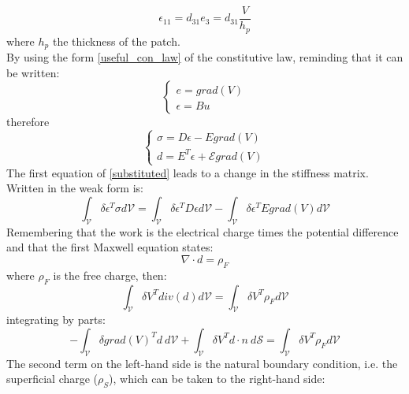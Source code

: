 \documentclass[twocolumn,a4paper,10pt,english]{article}
\begin{document}
            \begin{equation*}
            \epsilon_{11}=d_{31}e_3=d_{31}\dfrac{V}{h_p}
            \end{equation*}
            where $h_p$ the thickness of the patch.\\
            By using the form \ref{useful_con_law} of the constitutive law, reminding that it can be written:
             \begin{equation}
             \begin{cases}
             e=grad(V) \\
             \epsilon = Bu 
             \end{cases}	
             \end{equation}
             therefore
              \begin{equation}
              \begin{cases}
              \sigma = D\epsilon -E grad(V) \\
              d = E^T \epsilon + \mathcal{E} grad(V) 
              \end{cases}
              \label{substituted}	
              \end{equation}
              The first equation of \ref{substituted} leads to a change in the stiffness matrix. Written in the weak form is:
              \begin{equation}
              	\int_{\mathcal{V}} \delta \epsilon^T \sigma d\mathcal{V} = \int_{\mathcal{V}} \delta \epsilon^T D \epsilon d\mathcal{V}-\int_{\mathcal{V}} \delta \epsilon^T E grad(V) d\mathcal{V}
              \end{equation}
				Remembering that the work is the electrical charge times the potential difference and that the first Maxwell equation states:
				\begin{equation}
					\nabla \cdot d = \rho_F
				\end{equation}
				where $\rho_F$ is the free charge, then:
				\begin{equation}
				\int_{\mathcal{V}} \delta V^T div(d) d\mathcal{V}=\int_{\mathcal{V}} \delta V^T \rho_F d\mathcal{V}	
				\end{equation}
				integrating by parts:
				\begin{equation}
						-\int_{\mathcal{V}} \delta grad(V)^T d~ d\mathcal{V}+\int_{\mathcal{V}} \delta V^T d\cdot n~ d\mathcal{S}=\int_{\mathcal{V}} \delta V^T \rho_F d\mathcal{V}
				\end{equation}
				The second term on the left-hand side is the natural boundary condition, i.e. the superficial charge ($\rho_S$), which can be taken to the right-hand side:
\end{document}
